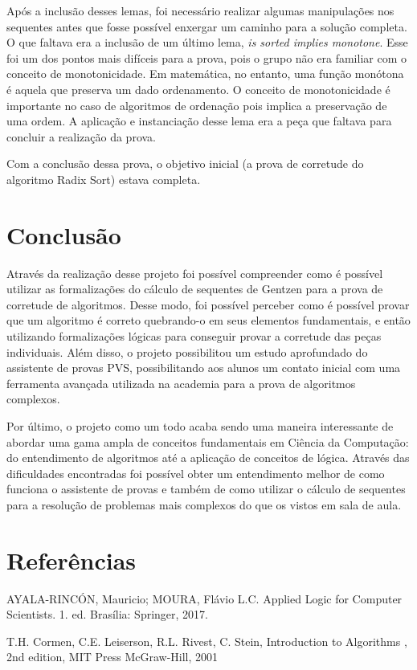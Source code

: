\documentclass[12pt]{article}
\begin{document}
Após a inclusão desses lemas, foi necessário realizar algumas manipulações nos sequentes antes que fosse possível enxergar um caminho para a solução completa. O que faltava era a inclusão de um último lema, \textit{is sorted implies monotone}. Esse foi um dos pontos mais difíceis para a prova, pois o grupo não era familiar com o conceito de monotonicidade. Em matemática, no entanto, uma função monótona é aquela que preserva um dado ordenamento. O conceito de monotonicidade é importante no caso de algoritmos de ordenação pois implica a preservação de uma ordem. A aplicação e instanciação desse lema era a peça que faltava para concluir a realização da prova.

Com a conclusão dessa prova, o objetivo inicial (a prova de corretude do algoritmo Radix Sort) estava completa.

\section{Conclusão}
Através da realização desse projeto foi possível compreender como é possível utilizar as formalizações do cálculo de sequentes de Gentzen para a prova de corretude de algoritmos. Desse modo, foi possível perceber como é possível provar que um algoritmo é correto quebrando-o em seus elementos fundamentais, e então utilizando formalizações lógicas para conseguir provar a corretude das peças individuais. Além disso, o projeto possibilitou um estudo aprofundado do assistente de provas PVS, possibilitando aos alunos um contato inicial com uma ferramenta avançada utilizada na academia para a prova de algoritmos complexos.

Por último, o projeto como um todo acaba sendo uma maneira interessante de abordar uma gama ampla de conceitos fundamentais em Ciência da Computação: do entendimento de algoritmos até a aplicação de conceitos de lógica. Através das dificuldades encontradas foi possível obter um entendimento melhor de como funciona o assistente de provas e também de como utilizar o cálculo de sequentes para a resolução de problemas mais complexos do que os vistos em sala de aula.

\section{Referências}
AYALA-RINCÓN, Mauricio; MOURA, Flávio L.C. Applied Logic for Computer Scientists. 1. ed. Brasília: Springer, 2017.

T.H. Cormen, C.E. Leiserson, R.L. Rivest, C. Stein, Introduction to Algorithms , 2nd edition, MIT Press McGraw-Hill, 2001
\end{document}

